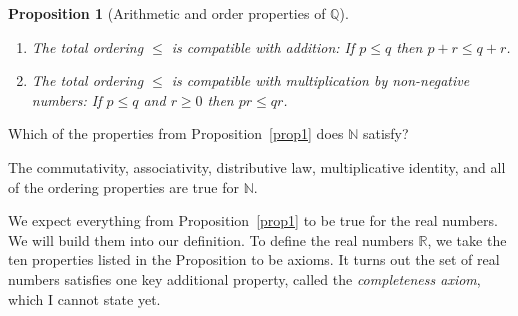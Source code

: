\documentclass[12pt]{amsart}
\newcommand{\Q}{\mathbb{Q}}
\newcommand{\R}{{\mathbb{R}}}
\newcommand{\N}{\mathbb{N}}
\numberwithin{equation}{section}
\theoremstyle{plain} %
\newtheorem{prop}[equation]{Proposition}
\theoremstyle{definition}
\theoremstyle{remark}
\begin{document}
\begin{prop}[Arithmetic and order properties of $\Q$]
\begin{enumerate}
\begin{enumerate}
\item For all $p, q \in \Q$, either $p \leq q$ or $q \leq p$.
\item If $p \leq q$ and $q \leq p$, then $p = q$.
\item For all $p, q, r \in \Q$, if $p \leq q$ and $q \leq r$, then $p \leq r$.
\end{enumerate}
\item The total ordering $\leq$ is compatible with addition: If $p \leq q$ then $p + r \leq q + r$.
\item The total ordering $\leq$ is compatible with multiplication by non-negative numbers: 
If $p \leq q$ and $r \geq 0$ then $pr \leq qr$.
\end{enumerate}
\end{prop}



Which of the properties from Proposition~\ref{prop1} does $\N$ satisfy?

The commutativity, associativity, distributive law, multiplicative identity, and all of the ordering properties are true for $\N$.


We expect everything from Proposition~\ref{prop1} to be true for the real numbers. We will build them into our definition.
To define the real numbers $\R$, we take the ten properties listed in the Proposition to be axioms. 
It turns out the set of real numbers satisfies one key additional
property, called the {\em completeness axiom}, which I cannot state yet. 
\end{document}
